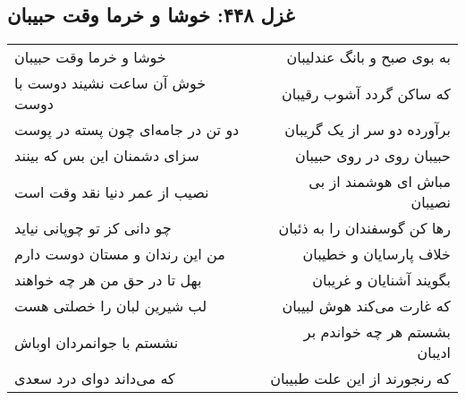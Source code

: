 \begin{center}
\section*{غزل ۴۴۸: خوشا و خرما وقت حبیبان}
\label{sec:448}
\begin{longtable}{l p{0.5cm} r}
خوشا و خرما وقت حبیبان
&&
به بوی صبح و بانگ عندلیبان
\\
خوش آن ساعت نشیند دوست با دوست
&&
که ساکن گردد آشوب رقیبان
\\
دو تن در جامه‌ای چون پسته در پوست
&&
برآورده دو سر از یک گریبان
\\
سزای دشمنان این بس که بینند
&&
حبیبان روی در روی حبیبان
\\
نصیب از عمر دنیا نقد وقت است
&&
مباش ای هوشمند از بی نصیبان
\\
چو دانی کز تو چوپانی نیاید
&&
رها کن گوسفندان را به ذئبان
\\
من این رندان و مستان دوست دارم
&&
خلاف پارسایان و خطیبان
\\
بهل تا در حق من هر چه خواهند
&&
بگویند آشنایان و غریبان
\\
لب شیرین لبان را خصلتی هست
&&
که غارت می‌کند هوش لبیبان
\\
نشستم با جوانمردان اوباش
&&
بشستم هر چه خواندم بر ادیبان
\\
که می‌داند دوای درد سعدی
&&
که رنجورند از این علت طبیبان
\\
\end{longtable}
\end{center}
